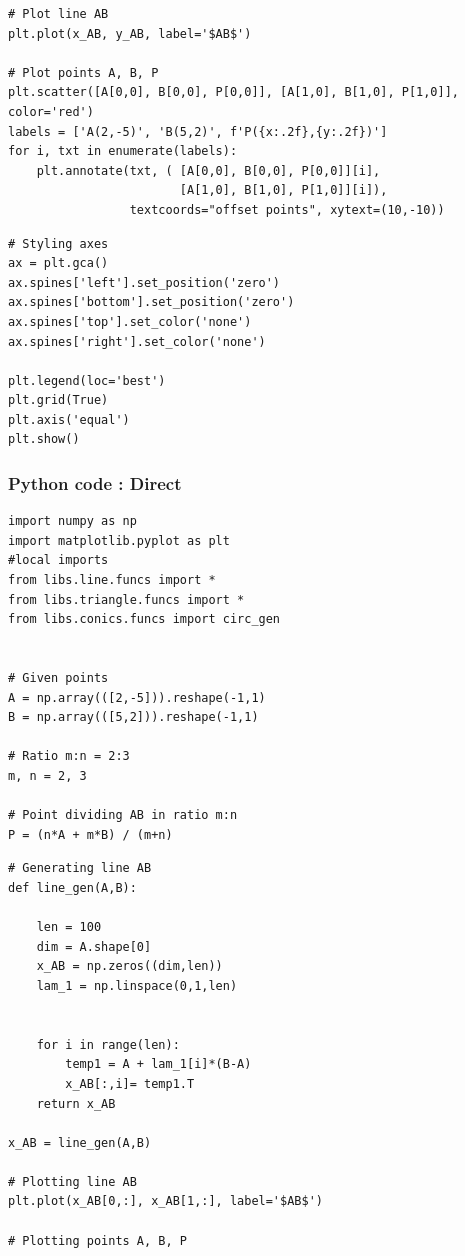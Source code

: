\documentclass{beamer}
\begin{document}
\begin{frame}[fragile]
	
	\begin{lstlisting}
# Plot line AB
plt.plot(x_AB, y_AB, label='$AB$')

# Plot points A, B, P
plt.scatter([A[0,0], B[0,0], P[0,0]], [A[1,0], B[1,0], P[1,0]], color='red')
labels = ['A(2,-5)', 'B(5,2)', f'P({x:.2f},{y:.2f})']
for i, txt in enumerate(labels):
    plt.annotate(txt, ( [A[0,0], B[0,0], P[0,0]][i],
                        [A[1,0], B[1,0], P[1,0]][i]),
                 textcoords="offset points", xytext=(10,-10))
	\end{lstlisting}
\end{frame}
\begin{frame}[fragile]
	
	\begin{lstlisting}
# Styling axes
ax = plt.gca()
ax.spines['left'].set_position('zero')
ax.spines['bottom'].set_position('zero')
ax.spines['top'].set_color('none')
ax.spines['right'].set_color('none')

plt.legend(loc='best')
plt.grid(True)
plt.axis('equal')
plt.show()

	\end{lstlisting}
\end{frame}

	\begin{frame}[fragile]
\frametitle{Python code : Direct }

\begin{lstlisting}
import numpy as np
import matplotlib.pyplot as plt
#local imports
from libs.line.funcs import *
from libs.triangle.funcs import *
from libs.conics.funcs import circ_gen


# Given points
A = np.array(([2,-5])).reshape(-1,1)
B = np.array(([5,2])).reshape(-1,1)

# Ratio m:n = 2:3
m, n = 2, 3

# Point dividing AB in ratio m:n
P = (n*A + m*B) / (m+n)
\end{lstlisting}
\end{frame}

\begin{frame}[fragile]

\begin{lstlisting}
# Generating line AB
def line_gen(A,B):

    len = 100
    dim = A.shape[0]
    x_AB = np.zeros((dim,len))
    lam_1 = np.linspace(0,1,len)
    
    
    for i in range(len):
        temp1 = A + lam_1[i]*(B-A)
        x_AB[:,i]= temp1.T
    return x_AB

x_AB = line_gen(A,B)

# Plotting line AB
plt.plot(x_AB[0,:], x_AB[1,:], label='$AB$')

# Plotting points A, B, P
\end{lstlisting}
\end{frame}
\end{document}
